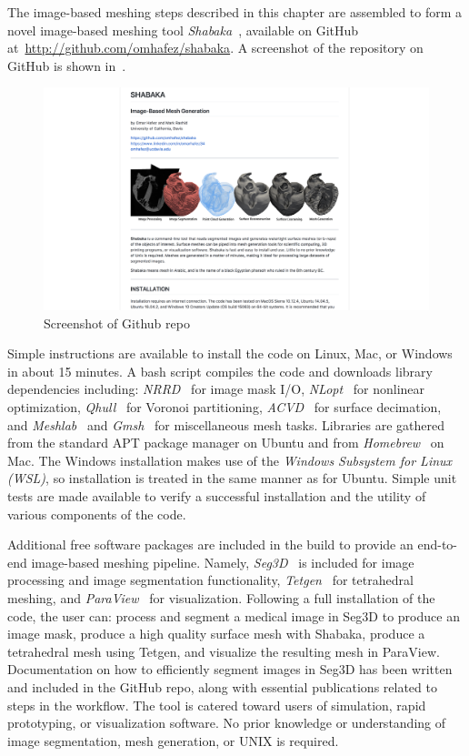 The image-based meshing steps described in this chapter are assembled to form a novel image-based meshing tool \textit{Shabaka}~\cite{shab}, available on GitHub at~\href{http://github.com/omhafez/shabaka}{{\url{http://github.com/omhafez/shabaka}}}. A screenshot of the repository on GitHub is shown in~.

\begin{figure}[ht!]
\centering
\vspace{2.5mm}
\includegraphics[width=1.0\textwidth]{media/2-shabaka/2-surf/7-shabaka.png}
\caption{Screenshot of Github repo}
\label{fig:github}
\end{figure}

Simple instructions are available to install the code on Linux, Mac, or Windows in about 15 minutes. A bash script compiles the code and downloads library dependencies including: \textit{NRRD}~\cite{nrrd} for image mask I/O, \textit{NLopt}~\cite{nlo} for nonlinear optimization, \textit{Qhull}~\cite{barber_1996} for Voronoi partitioning, \textit{ACVD}~\cite{valette_2004} for surface decimation, and \textit{Meshlab}~\cite{meshlab} and \textit{Gmsh}~\cite{geuzaine_2009} for miscellaneous mesh tasks. Libraries are gathered from the standard APT package manager on Ubuntu and from \textit{Homebrew}~\cite{brew} on Mac. The Windows installation makes use of the \textit{Windows Subsystem for Linux (WSL)}, so installation is treated in the same manner as for Ubuntu. Simple unit tests are made available to verify a successful installation and the utility of various components of the code.

Additional free software packages are included in the build to provide an end-to-end image-based meshing pipeline. Namely, \textit{Seg3D}~\cite{Seg3D} is included for image processing and image segmentation functionality, \textit{Tetgen}~\cite{tetgen} for tetrahedral meshing, and \textit{ParaView}~\cite{paraview} for visualization. Following a full installation of the code, the user can: process and segment a medical image in Seg3D to produce an image mask, produce a high quality surface mesh with Shabaka, produce a tetrahedral mesh using Tetgen, and visualize the resulting mesh in ParaView. Documentation on how to efficiently segment images in Seg3D has been written and included in the GitHub repo, along with essential publications related to steps in the workflow. The tool is catered toward users of simulation, rapid prototyping, or visualization software. No prior knowledge or understanding of image segmentation, mesh generation, or UNIX is required.


